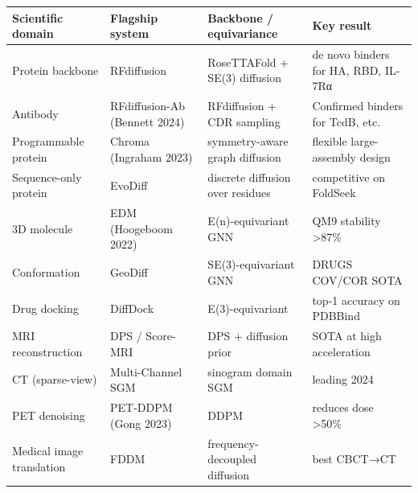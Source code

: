 {\def\LTcaptype{none} %
\begin{longtable}[]{@{}
  >{\raggedright\arraybackslash}p{}
  >{\raggedright\arraybackslash}p{}
  >{\raggedright\arraybackslash}p{}
  >{\raggedright\arraybackslash}p{}@{}}
\toprule\noalign{}
\begin{minipage}[b]{\linewidth}\raggedright
Scientific domain
\end{minipage} & \begin{minipage}[b]{\linewidth}\raggedright
Flagship system
\end{minipage} & \begin{minipage}[b]{\linewidth}\raggedright
Backbone / equivariance
\end{minipage} & \begin{minipage}[b]{\linewidth}\raggedright
Key result
\end{minipage} \\
\midrule\noalign{}
\endhead
\bottomrule\noalign{}
\endlastfoot
Protein backbone & RFdiffusion & RoseTTAFold + SE(3) diffusion & de novo binders for HA, RBD, IL-7Rα \\
Antibody & RFdiffusion-Ab (Bennett 2024) & RFdiffusion + CDR sampling & Confirmed binders for TcdB, etc. \\
Programmable protein & Chroma (Ingraham 2023) & symmetry-aware graph diffusion & flexible large-assembly design \\
Sequence-only protein & EvoDiff & discrete diffusion over residues & competitive on FoldSeek \\
3D molecule & EDM (Hoogeboom 2022) & E(n)-equivariant GNN & QM9 stability \textgreater87\% \\
Conformation & GeoDiff & SE(3)-equivariant GNN & DRUGS COV/COR SOTA \\
Drug docking & DiffDock & E(3)-equivariant & top-1 accuracy on PDBBind \\
MRI reconstruction & DPS / Score-MRI & DPS + diffusion prior & SOTA at high acceleration \\
CT (sparse-view) & Multi-Channel SGM & sinogram domain SGM & leading 2024 \\
PET denoising & PET-DDPM (Gong 2023) & DDPM & reduces dose \textgreater50\% \\
Medical image translation & FDDM & frequency-decoupled diffusion & best CBCT→CT \\

\end{longtable}}
